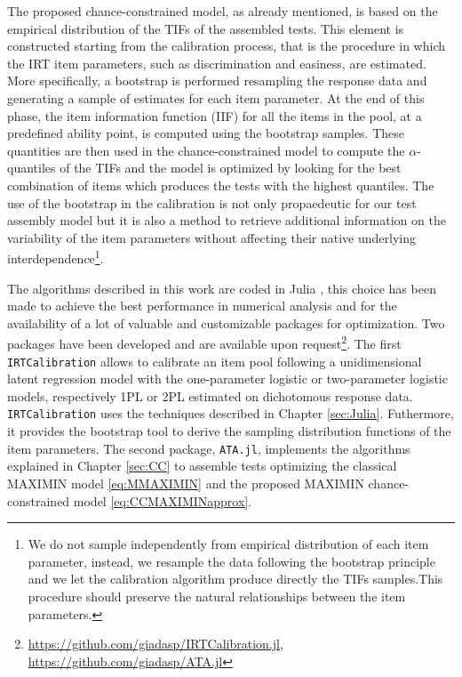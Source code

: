 The proposed chance-constrained model, as already mentioned, is based on the empirical distribution of the TIFs of the assembled tests. This element is constructed starting from the calibration process, that is the procedure in which the IRT item parameters, such as discrimination and easiness, are estimated.
More specifically, a bootstrap is performed resampling the response data and generating a sample of estimates for each item parameter.
At the end of this phase, the item information function (IIF) for all the items in the pool, at a predefined ability point, is computed using the bootstrap samples.
These quantities are then used in the chance-constrained model to compute the $\alpha$-quantiles of the TIFs and the model is optimized by looking for the best combination of items which produces the tests with the highest quantiles. 
The use of the bootstrap in the calibration is not only propaedeutic for our test assembly model but it is also a method to retrieve additional information on the variability of the item parameters without affecting their native underlying interdependence\footnote{We do not sample independently from empirical distribution of each item parameter, instead, we resample the data following the bootstrap principle and we let the calibration algorithm produce directly the TIFs samples.This procedure should preserve the natural relationships between the item parameters.}. 

The algorithms described in this work are coded in Julia \parencite{bezanson2017julia}, this choice has been made to achieve the best performance in numerical analysis and for the availability of a lot of valuable and customizable packages for optimization.
Two packages have been developed and are available upon request\footnote{\url{https://github.com/giadasp/IRTCalibration.jl}, \url{https://github.com/giadasp/ATA.jl}}.
The first \texttt{IRTCalibration} allows to calibrate an item pool following a unidimensional latent regression model with the one-parameter logistic or two-parameter logistic models, respectively 1PL or 2PL estimated on dichotomous response data.
\texttt{IRTCalibration} uses the techniques described in Chapter \ref{sec:Julia}.
Futhermore, it provides the bootstrap tool to derive the sampling distribution functions of the item parameters.
The second package, \texttt{ATA.jl}, implements the algorithms explained in Chapter \ref{sec:CC} to assemble tests optimizing the classical MAXIMIN model \eqref{eq:MMAXIMIN} and the proposed MAXIMIN chance-constrained model \eqref{eq:CCMAXIMINapprox}.

